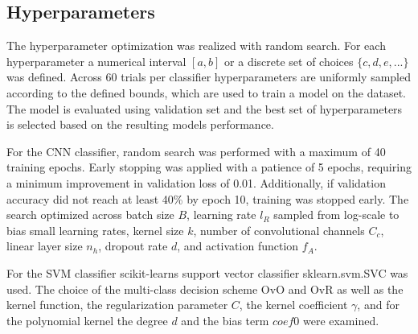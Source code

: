 \documentclass[a4, 10 pt, conference]{ieeeconf}  %
\begin{document}
\subsection{Hyperparameters}
\label{subsec:hyperparameters}

The hyperparameter optimization was realized with random search. For each
hyperparameter a numerical interval $[a, b]$ or a discrete set of choices $\{c,d,e,...\}$
was defined. Across 60 trials per classifier hyperparameters are uniformly sampled according
to the defined bounds, which are used to train a model on the dataset. The model is
evaluated using validation set and the best set of hyperparameters is selected
based on the resulting models performance.

For the CNN classifier, random search was performed with a maximum of 40 training epochs.
Early stopping was applied with a patience of 5 epochs, requiring a minimum improvement in
validation loss of 0.01. Additionally, if validation accuracy did not reach at least 40\% by
epoch 10, training was stopped early. The search optimized across batch size $B$, learning rate
$l_R$ sampled from log-scale to bias small learning rates, kernel size $k$, number of convolutional channels $C_c$, linear layer size $n_h$, dropout
rate $d$, and activation function $f_A$.

For the SVM classifier scikit-learns support vector classifier sklearn.svm.SVC was used.
The choice of the multi-class decision scheme OvO and OvR as well as the kernel function,
the regularization parameter $C$, the kernel coefficient $\gamma$, and for the
polynomial kernel the degree $d$ and the bias term $coef0$ were examined.
\end{document}
